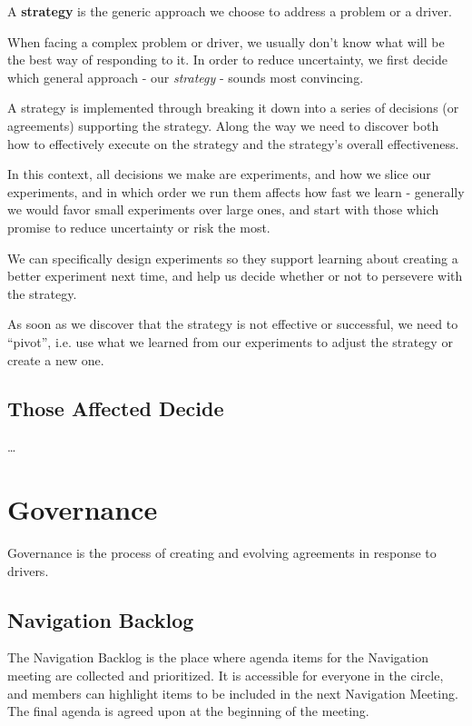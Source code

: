A \textbf{strategy} is the generic approach we choose to address a problem or a driver.

When facing a complex problem or driver, we usually don't know what will be the best way of responding to it. In order to reduce uncertainty, we first decide which general approach - our \emph{strategy} - sounds most convincing.

A strategy is implemented through breaking it down into a series of decisions (or agreements) supporting the strategy. Along the way we need to discover both how to effectively execute on the strategy and the strategy's overall effectiveness.

In this context, all decisions we make are experiments, and how we slice our experiments, and in which order we run them affects how fast we learn - generally we would favor small experiments over large ones, and start with those which promise to reduce uncertainty or risk the most.

We can specifically design experiments so they support learning about creating a better experiment next time, and help us decide whether or not to persevere with the strategy.

As soon as we discover that the strategy is not effective or successful, we need to ``pivot'', i.e. use what we learned from our experiments to adjust the strategy or create a new one.

\section{Those Affected Decide}
\label{thoseaffecteddecide}

{\ldots}

\chapter{Governance}
\label{governance}

Governance is the process of creating and evolving agreements in response to drivers.

\section{Navigation Backlog}
\label{navigationbacklog}

The Navigation Backlog is the place where agenda items for the Navigation meeting are collected and prioritized. It is accessible for everyone in the circle, and members can highlight items to be included in the next Navigation Meeting. The final agenda is agreed upon at the beginning of the meeting.

